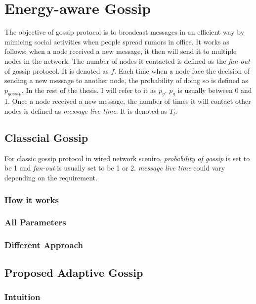 \chapter{Energy-aware Gossip}

The objective of gossip protocol is to broadcast messages in an efficient way by mimicing social activities when people spread rumors in office. It works as follows: when a node received a new message, it then will send it to multiple nodes in the network. The number of nodes it contacted is defined as the \emph{fan-out} of gossip protocol. It is denoted as $f$. Each time when a node face the decision of sending a new message to another node, the probability of doing so is defined as $p_{gossip}$. In the rest of the thesis, I will refer to it as $p_g$. $p_g$ is usually between 0 and 1. Once a node received a new message, the number of times it will contact other nodes is defined as \emph{message live time}. It is denoted as $T_l$.



\section{Classcial Gossip}
For classic gossip protocol in wired network sceniro, \emph{probability of gossip} is set to be 1 and \emph{fan-out} is usually set to be 1 or 2. 
\emph{message live time} could vary depending on the requirement. 

\subsection{How it works}

\subsection{All Parameters}

\subsection{Different Approach}

\section{Proposed Adaptive Gossip}



\subsection{Intuition}



